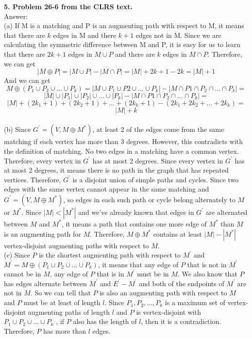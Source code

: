 \documentclass{article}
\begin{document}
\maketitle
\noindent
\textbf{5. Problem 26-6 from the CLRS text.} \\
\noindent
Answer: \\
(a) If M is a matching and P is an augmenting path with respect to M, it means that there are $k$ edges in M and there $k + 1$ edges not in M. Since we are calculating the symmetric difference between M and P, it is easy for us to learn that there are $2k + 1$ edges in $M\cup P$ and there are $k$ edges in $M\cap P$. Therefore, we can get $$|M \oplus P| = |M\cup P| - |M\cap P| = |M| + 2k + 1 - 2k = |M| + 1$$ And we can get $$M \oplus (P_1\cup P_2 \cup ... \cup P_k )  = |M\cup P_1\cup P2\cup ... \cup P_k| - |M\cap P1\cap P_2\cap ... \cap P_k| = $$ $$|M|\cup |P_1|\cup |P_2|\cup ... \cup |P_k| -  |M\cap P1\cap P_2\cap ... \cap P_k| = $$ $$|M| + (2k_1 + 1) + (2k_2 + 1) + ... + (2k_k + 1) - (2k_1 + 2k_2 + ... + 2k_k) = $$ $$|M| + k$$ \\
(b) Since $G^{'} = (V, M\oplus M^{*})$, at least 2 of the edges come from the same matching if each vertex has more than 3 degrees. However, this contradicts with the definition of matching. No two edges in a matching have a common vertex. Therefore, every vertex in $G^{'}$ has at most 2 degrees. Since every vertex in $G^{'}$ has at most 2 degrees, it means there is no path in the graph that has repeated vertices. Therefore, $G^{'}$ is a disjoint union of simple paths and cycles. Since two edges with the same vertex cannot appear in the same matching and $G^{'} = (V, M\oplus M^{*})$, so edges in each such path or cycle belong alternately to $M$ or $M^{*}$. Since $|M| < |M^{*}|$ and we've already known that edges in $G^{'}$ are alternated between $M$ and $M^{*}$, it means a path that contains one more edge of $M^{*}$ than $M$ is an augmenting path for $M$. Therefore, $M\oplus M^{*}$ contains at least $|M| - |M^{*}|$ vertex-disjoint augmenting paths with respect to $M$.\\ \newline
(c) Since $P$ is the shortest augmenting path with respect to $M^{'}$ and $M^{'} = M\oplus (P_1\cup P_2\cup ... \cup P_k)$, it means that any edge of $P$ that is not in $M^{'}$ cannot be in $M$, any edge of $P$ that is in $M^{'}$ must be in $M$. We also know that $P$ has edges alternate between $M^{'}$ and $E^{'} - M^{'}$ and both of the endpoints of $M^{'}$ are not in $M$. So we can tell that $P$ is also an augmenting path with respect to $M$ and $P$ must be at least of length $l$. Since $P_1, P_2, ... ,P_k$ is a maximum set of vertex-disjoint augmenting paths of length $l$ and $P$ is vertex-disjoint with $P_1\cup P_2\cup ... \cup P_k$ , if $P$ also has the length of $l$, then it is a contradiction. Therefore, $P$ has more than $l$ edges. \\ \newline
\end{document}
